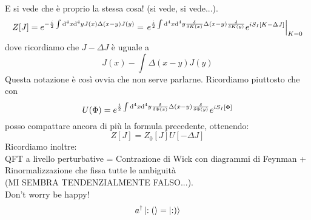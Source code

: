 \documentclass[a4paper, 11pt]{article}
\begin{document}
	E si vede che è proprio la stessa cosa! (si vede, si vede...).
	\[Z[J]= e^{-\frac{i}{2}\int \mathrm{d}^4 x \mathrm{d}^4 y J(x) \Delta(x-y) J(y)} = \left. e^{\frac{i}{2}\int \mathrm{d}^4 x \mathrm{d}^4 y \frac{\delta}{\delta K(x)} \Delta(x-y) \frac{\delta}{\delta K(y)}}e^{iS_I[K-\Delta J]} \right|_{K=0}\]
	dove ricordiamo che $J-\Delta J$ è uguale a
	\[J(x) - \int \Delta(x-y)J(y)\]
	Questa notazione è così ovvia che non serve parlarne.
	Ricordiamo piuttosto che con
	\[U(\Phi) = e^{\frac{i}{2}\int \mathrm{d}^4x \mathrm{d}^4y \frac{\delta}{\delta \Phi(x)}\Delta(x-y)\frac{\delta}{\delta \Phi(y)}} e^{iS_I[\Phi]}\]
	posso compattare ancora di più la formula precedente, ottenendo:
	\[Z[J] = Z_0[J] U[-\Delta J]\]
	Ricordiamo inoltre:\\
	QFT a livello perturbative = Contrazione di Wick con diagrammi di Feynman + Rinormalizzazione che fissa tutte le ambiguità\\
	(MI SEMBRA TENDENZIALMENTE FALSO...).\\
	
	
	
	\noindent Don't worry be happy!\\
	\[a^\dagger \left| :(\right\rangle = \left| :)\right\rangle\]
	
	
	\newpage
	
\end{document}
